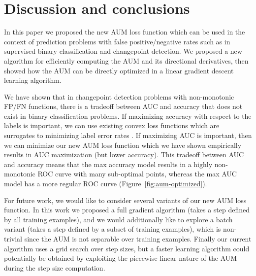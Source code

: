 \documentclass{article}
\begin{document}


\section{Discussion and conclusions}
\label{sec:discussion}

In this paper we proposed the new AUM loss function which can be used in the context of prediction problems with false positive/negative rates such as in supervised binary classification and changepoint detection.
We proposed a new algorithm for efficiently computing the AUM and its directional derivatives, then showed how the AUM can be directly optimized in a linear gradient descent learning algorithm. 


We have shown that in changepoint detection problems with non-monotonic FP/FN functions, there is a tradeoff between AUC and accuracy that does not exist in binary classification problems.
If maximizing accuracy with respect to the labels is important, we can use existing convex loss functions which are surrogates to minimizing label error rates \citep{Hocking2013icml}.
If maximizing AUC is important, then we can minimize our new AUM loss function which we have shown empirically results in AUC maximization (but lower accuracy).
This tradeoff between AUC and accuracy means that the max accuracy model results in a highly non-monotonic ROC curve with many sub-optimal points, whereas the max AUC model has a more regular ROC curve (Figure~\ref{fig:aum-optimized}).


For future work, we would like to consider several variants of our new AUM loss function.
In this work we proposed a full gradient algorithm (takes a step defined by all training examples), and we would additionally like to explore a batch variant (takes a step defined by a subset of training examples), which is non-trivial since the AUM is not separable over training examples.
Finally our current algorithm uses a grid search over step sizes, but a faster learning algorithm could potentially be obtained by exploiting the piecewise linear nature of the AUM during the step size computation.
\end{document}
